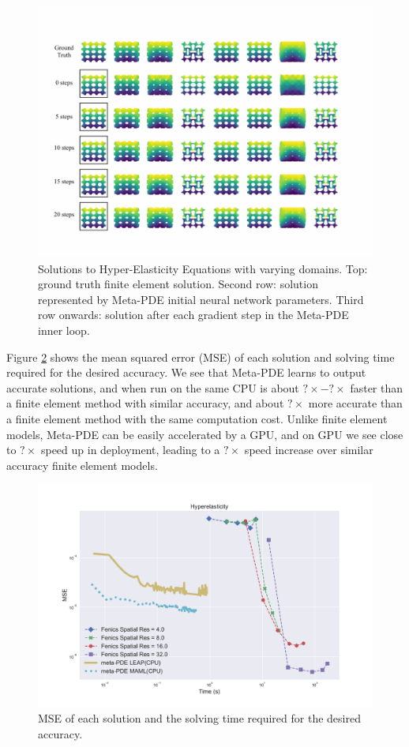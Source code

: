 \begin{figure}[htbp]
  \centering
\includegraphics[width=0.8\linewidth]{figures/hyper_elasticity_circle_meta.pdf} 
\caption{Solutions to Hyper-Elasticity Equations with varying domains. Top: ground truth finite element solution. Second row: solution represented by Meta-PDE initial neural network parameters. Third row onwards: solution after each gradient step in the Meta-PDE inner loop.}
\label{fig:hyperelasticity_per_step}
\end{figure}

Figure \ref{fig:hyperelasricity_summary} shows the mean squared error (MSE) of each solution and solving time required for the desired accuracy. We see that Meta-PDE learns to output accurate solutions, and when run on the same CPU is about $?\times - ?\times$ faster than a finite element method with similar accuracy, and about $?\times$ more accurate than a finite element method with the same computation cost. Unlike finite element models, Meta-PDE can be easily accelerated by a GPU, and on GPU we see close to $?\times$ speed up in deployment, leading to a $?\times$ speed increase over similar accuracy finite element models.

\begin{figure}[htbp]
  \centering
\includegraphics[width=0.8\linewidth]{figures/hyperelasticity.pdf} 
\caption{MSE of each solution and the solving time required for the desired accuracy.}%
\label{fig:hyperelasricity_summary}%
\end{figure}
